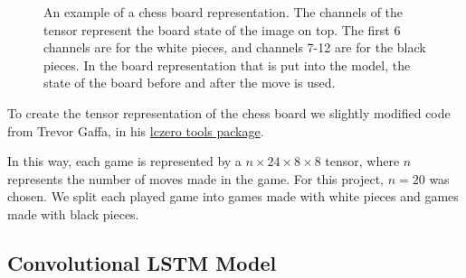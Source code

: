 \begin{figure}[ht!]
\begin{subfigure}[c]{0.74\textwidth}
    \end{subfigure}
    \caption{An example of a chess board representation. The channels of the tensor represent the board state of the image on top. The first 6 channels are for the white pieces, and channels 7-12 are for the black pieces. In the board representation that is put into the model, the state of the board before and after the move is used.}
    \label{fig:board_rep}
\end{figure}

\medskip\par
To create the tensor representation of the chess board we slightly modified code from Trevor Gaffa, in his \href{https://github.com/so-much-meta/lczero_tools/blob/master/src/lcztools/_leela_board.py}{lczero tools package}.

\medskip\par
In this way, each game is represented by a $n \times 24 \times 8 \times 8$ tensor, where $n$ represents the number of moves made in the game. For this project, $n = 20$ was chosen. We split each played game into games made with white pieces and games made with black pieces. 

\subsection{Convolutional LSTM Model}
